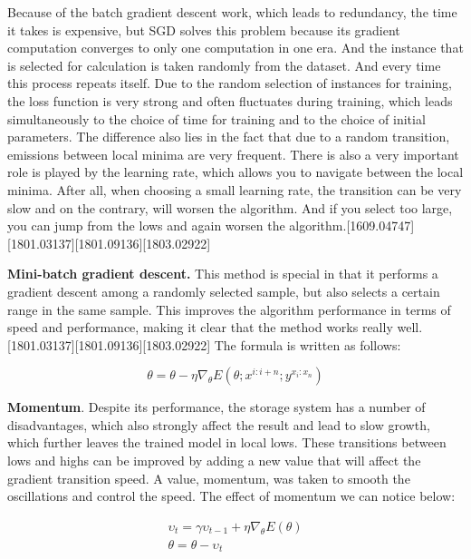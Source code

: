 \noindent Because of the batch gradient descent work, which leads to redundancy, the time it takes is expensive, but SGD solves this problem because its gradient computation converges to only one computation in one era. And the instance that is selected for calculation is taken randomly from the dataset. And every time this process repeats itself. Due to the random selection of instances for training, the loss function is very strong and often fluctuates during training, which leads simultaneously to the choice of time for training and to the choice of initial parameters. The difference also lies in the fact that due to a random transition, emissions between local minima are very frequent. There is also a very important role is played by the learning rate, which allows you to navigate between the local minima. After all, when choosing a small learning rate, the transition can be very slow and on the contrary, will worsen the algorithm. And if you select too large, you can jump from the lows and again worsen the algorithm.[1609.04747][1801.03137][1801.09136][1803.02922]



\noindent \textbf{Mini-batch gradient descent.} This method is special in that it performs a gradient descent among a randomly selected sample, but also selects a certain range in the same sample. This improves the algorithm performance in terms of speed and performance, making it clear that the method works really well.[1801.03137][1801.09136][1803.02922] The formula is written as follows:


\begin{equation}
 \theta = \theta- {\eta}{\nabla_\theta}E(\theta;x^{i:i+n};y^{x_i:x_n}) 
\end{equation}

\noindent \textbf{Momentum}. Despite its performance, the storage system has a number of disadvantages, which also strongly affect the result and lead to slow growth, which further leaves the trained model in local lows. These transitions between lows and highs can be improved by adding a new value that will affect the gradient transition speed. A value, momentum, was taken to smooth the oscillations and control the speed. The effect of momentum we can notice below:

\begin{equation}
	\begin{split}
		\upsilon_t = \gamma\upsilon_{t-1} + \eta\nabla_\theta E(\theta) \\
		\theta = \theta - \upsilon_t
	\end{split}
\end{equation}


